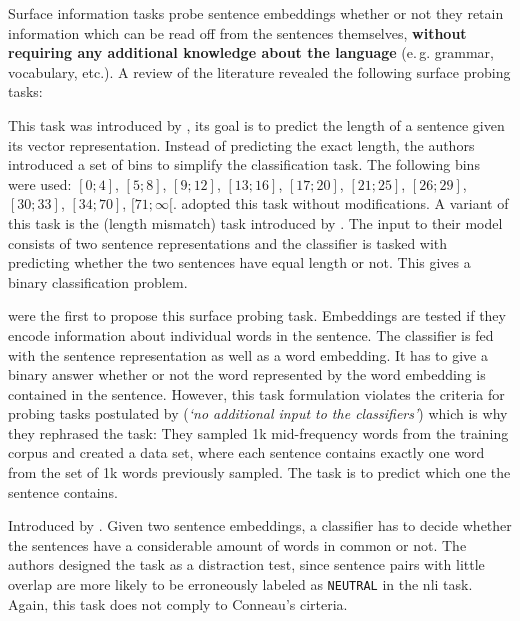 Surface information tasks probe sentence embeddings whether or not they retain information which can be read off from the sentences themselves,  \textbf{without requiring any additional knowledge about the language} (e.\,g. grammar, vocabulary, etc.). A review of the literature revealed the following surface probing tasks:

  This task was introduced by \citep{Adi.2017}, its goal is to predict the length of a sentence given its vector representation. Instead of predicting the exact length, the authors introduced a set of bins to simplify the classification task. The following bins were used: $[0; 4]$, $[5; 8]$, $[9; 12]$, $[13; 16]$, $[17; 20]$, $[21; 25]$, $[26; 29]$, $[30; 33]$, $[34; 70]$, $[71;\infty[$. \citep{Conneau.2018a} adopted this task without modifications. A variant of this task is the  (length mismatch) task introduced by \citep{Naik.2018}. The input to their model consists of two sentence representations and the classifier is tasked with predicting whether the two sentences have equal length or not. This gives a binary classification problem.  

  \citep{Adi.2017} were the first to propose this surface probing task. Embeddings are tested if they encode information about individual words in the sentence. The classifier is fed with the sentence representation as well as a word embedding. It has to give a binary answer whether or not the word represented by the word embedding is contained in the sentence. However, this task formulation violates the criteria for probing tasks postulated by \citep{Conneau.2018a} (\textit{`no additional input to the classifiers'}) which is why they rephrased the task: They sampled 1k mid-frequency words from the training corpus and created a data set, where each sentence contains exactly one word from the set of 1k words previously sampled. The task is to predict which one the sentence contains.

  Introduced by \citep{Naik.2018}. Given two sentence embeddings, a classifier has to decide whether the sentences have a considerable amount of words in common or not. The authors designed the task as a distraction test, since sentence pairs with little overlap are more likely to be erroneously labeled as \texttt{NEUTRAL} in the \gls{nli} task. Again, this task does not comply to Conneau's cirteria.


